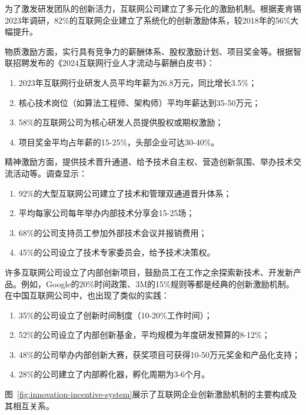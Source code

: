 为了激发研发团队的创新活力，互联网公司建立了多元化的激励机制\cite{zhou2020positive,zhao2022diversity}。根据麦肯锡2023年调研，82\%的互联网企业建立了系统化的创新激励体系，较2018年的56\%大幅提升\cite{mckinsey2023tech}。

物质激励方面，实行具有竞争力的薪酬体系、股权激励计划、项目奖金等。根据智联招聘发布的《2024互联网行业人才流动与薪酬白皮书》：
\begin{enumerate}
\item 2023年互联网行业研发人员平均年薪为26.8万元，同比增长3.5\%；
\item 核心技术岗位（如算法工程师、架构师）平均年薪达到35-50万元；
\item 58\%的互联网公司为核心研发人员提供股权或期权激励；
\item 项目奖金平均占年薪的15-25\%，头部企业可达30-40\%\cite{zhaopin2024tech}。
\end{enumerate}

精神激励方面，提供技术晋升通道、给予技术自主权、营造创新氛围、举办技术交流活动等\cite{tang2022motivation,goh2022thriving}。调查显示：
\begin{enumerate}
\item 92\%的大型互联网公司建立了技术和管理双通道晋升体系；
\item 平均每家公司每年举办内部技术分享会15-25场；
\item 68\%的公司支持员工参加外部技术会议并报销费用；
\item 45\%的公司设立了技术专家委员会，给予技术决策权\cite{mckinsey2023tech}。
\end{enumerate}

许多互联网公司设立了内部创新项目，鼓励员工在工作之余探索新技术、开发新产品\cite{xu2011total}。例如，Google的20\%时间政策、3M的15\%规则等都是经典的创新激励机制。在中国互联网公司中，也出现了类似的实践\cite{gao2014open,zhang2008open}：
\begin{enumerate}
\item 35\%的公司设立了创新时间制度（10-20\%工作时间）；
\item 52\%的公司设立了内部创新基金，平均规模为年度研发预算的8-12\%；
\item 48\%的公司举办内部创新大赛，获奖项目可获得10-50万元奖金和产品化支持；
\item 28\%的公司建立了内部孵化器，孵化周期为3-6个月\cite{idc2023agile}。
\end{enumerate}

图~\ref{fig:innovation-incentive-system}展示了互联网企业创新激励机制的主要构成及其相互关系。


